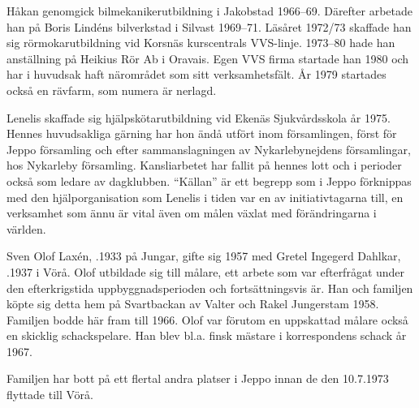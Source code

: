 Håkan genomgick bilmekanikerutbildning i Jakobstad 1966--69. Därefter arbetade han på Boris Lindéns bilverkstad i Silvast 1969--71. Läsåret 1972/73 skaffade han sig rörmokarutbildning vid Korsnäs kurscentrals VVS-linje. 1973--80 hade han anställning på Heikius Rör Ab i Oravais. Egen VVS firma startade han 1980 och har i huvudsak haft närområdet som sitt verksamhetsfält. År 1979 startades också en rävfarm, som numera är nerlagd.

Lenelis skaffade sig hjälpskötarutbildning vid Ekenäs Sjukvårdsskola år 1975. Hennes huvudsakliga gärning har hon ändå utfört inom församlingen, först för Jeppo församling och efter sammanslagningen av Nykarlebynejdens församlingar, hos Nykarleby församling.  Kansliarbetet har fallit på hennes lott och i perioder också som ledare av dagklubben. ``Källan'' är ett begrepp som i Jeppo förknippas med den hjälporganisation som Lenelis i tiden var en av initiativtagarna till, en verksamhet som ännu är vital även om målen växlat med förändringarna i världen.
\begin{jhchildren}
  \item {}
  \item {}
  \item {}
\end{jhchildren}


%
Sven Olof Laxén, .1933 på Jungar, gifte sig 1957 med Gretel Ingegerd Dahlkar, .1937 i Vörå. Olof utbildade sig till målare, ett arbete som var efterfrågat under den efterkrigstida uppbyggnadsperioden och fortsättningsvis är. Han och familjen köpte sig detta hem på Svartbackan av Valter och Rakel Jungerstam 1958. Familjen bodde här fram till 1966. Olof var förutom en uppskattad målare också en skicklig schackspelare. Han blev bl.a. finsk mästare i korrespondens schack år 1967.
\begin{jhchildren}
  \item {}
  \item {}
\end{jhchildren}

Familjen har bott på ett flertal andra platser i Jeppo innan de den 10.7.1973 flyttade till Vörå.


